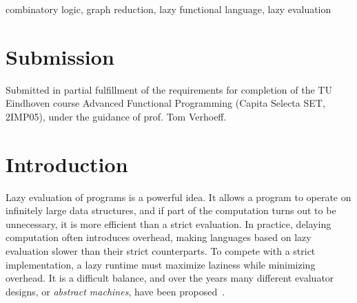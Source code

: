 \documentclass[conference]{IEEEtran}
\begin{document}
\begin{abstract}
\end{abstract}

\begin{IEEEkeywords}
    combinatory logic, graph reduction, lazy functional language, lazy evaluation
\end{IEEEkeywords}

\section{Submission}
Submitted in partial fulfillment of the requirements for completion of the TU Eindhoven course Advanced Functional Programming (Capita Selecta SET, 2IMP05), under the guidance of prof. Tom Verhoeff.

\section{Introduction}
Lazy evaluation of programs is a powerful idea.
It allows a program to operate on infinitely large data structures, and if part of the computation turns out to be unnecessary, it is more efficient than a strict evaluation.
In practice, delaying computation often introduces overhead, making languages based on lazy evaluation slower than their strict counterparts.
To compete with a strict implementation, a lazy runtime must maximize laziness while minimizing overhead.
It is a difficult balance, and over the years many different evaluator designs, or \textit{abstract machines}, have been proposed~\cite{turner_new_1979,kieburtz_g-machine_1985,fairbairn_tim_1987,burn_spineless_1988,koopman_fresh_1989,jones_implementing_nodate}.
\end{document}
